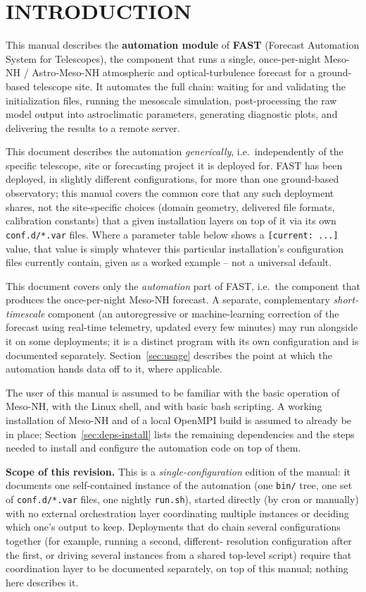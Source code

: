 \section{INTRODUCTION}

This manual describes the \textbf{automation module} of \textbf{FAST} (Forecast Automation System for
Telescopes), the component that runs a single, once-per-night Meso-NH / Astro-Meso-NH atmospheric and
optical-turbulence forecast for a ground-based telescope site. It automates the full chain: waiting for
and validating the initialization files, running the mesoscale simulation, post-processing the raw
model output into astroclimatic parameters, generating diagnostic plots, and delivering the results to
a remote server.

This document describes the automation \emph{generically}, i.e.\ independently of the specific
telescope, site or forecasting project it is deployed for. FAST has been deployed, in slightly
different configurations, for more than one ground-based observatory; this manual covers the common
core that any such deployment shares, not the site-specific choices (domain geometry, delivered file
formats, calibration constants) that a given installation layers on top of it via its own
\texttt{conf.d/*.var} files. Where a parameter table below shows a \texttt{[current: ...]} value, that
value is simply whatever this particular installation's configuration files currently contain, given as
a worked example -- not a universal default.

This document covers only the \emph{automation} part of FAST, i.e.\ the component that produces the
once-per-night Meso-NH forecast. A separate, complementary \emph{short-timescale} component (an
autoregressive or machine-learning correction of the forecast using real-time telemetry, updated every
few minutes) may run alongside it on some deployments; it is a distinct program with its own
configuration and is documented separately. Section~\ref{sec:usage} describes the point at which the
automation hands data off to it, where applicable.

The user of this manual is assumed to be familiar with the basic operation of Meso-NH, with the Linux
shell, and with basic bash scripting. A working installation of Meso-NH and of a local OpenMPI build is
assumed to already be in place; Section~\ref{sec:deps-install} lists the remaining dependencies and the
steps needed to install and configure the automation code on top of them.

\textbf{Scope of this revision.} This is a \emph{single-configuration} edition of the manual: it
documents one self-contained instance of the automation (one \texttt{bin/} tree, one set of
\texttt{conf.d/*.var} files, one nightly \texttt{run.sh}), started directly (by cron or manually) with
no external orchestration layer coordinating multiple instances or deciding which one's output to keep.
Deployments that do chain several configurations together (for example, running a second, different-
resolution configuration after the first, or driving several instances from a shared top-level script)
require that coordination layer to be documented separately, on top of this manual; nothing here
describes it.

